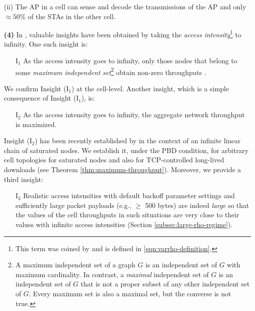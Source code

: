 \documentclass[10pt,a4paper,journal]{IEEEtran}
\theoremstyle{definition}
\theoremstyle{remark}
\theoremstyle{plain}
\begin{document}
\vspace{1mm}

\noindent (ii) The AP in a cell can sense and decode the transmissions of the AP and only $\approx 50\%$ of the STAs in the other cell. 

\vspace{1mm}

\noindent \textbf{(4)} In \cite{wanet.wang-kar05multihop,wanet.durvy09selfOrganization,wanet.liew_etal09ICCback-of-the-envelope}, valuable insights have been obtained by taking the \textit{access intensity}\footnote{This term was coined by \cite{wanet.durvy09selfOrganization} and is defined in \eqref{eqn:varrho-definition}.} to infinity. One such insight is:
\begin{itemize}
\item [I$_1$] As the access intensity goes to infinity, only those nodes that belong to some \textit{maximum independent set}\footnote{A maximum independent set of a graph $G$ is an independent set of $G$ with maximum cardinality. In contrast, a \textit{maximal} independent set of $G$ is an independent set of $G$ that is not a proper subset of any other independent set of $G$. Every maximum set is also a maximal set, but the converse is not true.} obtain non-zero throughputs \cite{wanet.wang-kar05multihop,wanet.durvy09selfOrganization,wanet.liew_etal09ICCback-of-the-envelope}.
\end{itemize}
We confirm Insight (I$_1$) at the cell-level. Another insight, which is a simple consequence of Insight (I$_1$), is: 
\begin{itemize}
\item [I$_2$] As the access intensity goes to infinity, the aggregate network throughput is maximized.
\end{itemize} 
Insight (I$_2$) has been recently established by \cite{wanet.durvy09selfOrganization} in the context of an infinite linear chain of saturated nodes. We establish it, under the PBD condition, for arbitrary cell topologies for saturated nodes and also for TCP-controlled long-lived downloads (see Theorem \ref{thm:maximum-throughput}). Moreover, we provide a third insight:
\begin{itemize}
\item [I$_3$] Realistic access intensities with default backoff parameter settings and sufficiently large packet payloads (e.g., $\geq$ 500 bytes) are indeed \textit{large} so that the values of the cell throughputs in such situations are very close to their values with infinite access intensities (Section \ref{subsec:large-rho-regime}).
\end{itemize} 
\end{document}
